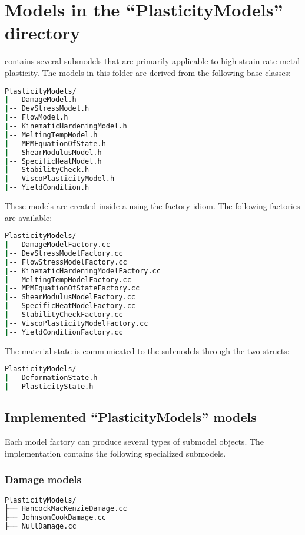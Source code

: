 \section{Models in the ``PlasticityModels'' directory}
 contains several submodels that
are primarily applicable to high strain-rate metal plasticity.  The
models in this folder are derived from the following base classes:
\begin{lstlisting}[language=sh, backgroundcolor=\color{background}]
PlasticityModels/
|-- DamageModel.h
|-- DevStressModel.h
|-- FlowModel.h
|-- KinematicHardeningModel.h
|-- MeltingTempModel.h
|-- MPMEquationOfState.h
|-- ShearModulusModel.h
|-- SpecificHeatModel.h
|-- StabilityCheck.h
|-- ViscoPlasticityModel.h
|-- YieldCondition.h
\end{lstlisting}

These models are created inside a  using the 
factory idiom.  The following factories are available:
\begin{lstlisting}[language=sh, backgroundcolor=\color{background}]
PlasticityModels/
|-- DamageModelFactory.cc
|-- DevStressModelFactory.cc
|-- FlowStressModelFactory.cc
|-- KinematicHardeningModelFactory.cc
|-- MeltingTempModelFactory.cc
|-- MPMEquationOfStateFactory.cc
|-- ShearModulusModelFactory.cc
|-- SpecificHeatModelFactory.cc
|-- StabilityCheckFactory.cc
|-- ViscoPlasticityModelFactory.cc
|-- YieldConditionFactory.cc
\end{lstlisting}

The material state is communicated to the submodels through the
two \textsf{struct}s:
\begin{lstlisting}[language=sh, backgroundcolor=\color{background}]
PlasticityModels/
|-- DeformationState.h
|-- PlasticityState.h
\end{lstlisting}

\subsection{Implemented ``PlasticityModels'' models}
Each model factory can produce several types of submodel objects.  
The \Vaango implementation contains the following specialized
submodels.

\subsubsection{Damage models}
\begin{lstlisting}[language=sh, backgroundcolor=\color{background}]
PlasticityModels/
├── HancockMacKenzieDamage.cc
├── JohnsonCookDamage.cc
├── NullDamage.cc
\end{lstlisting}

